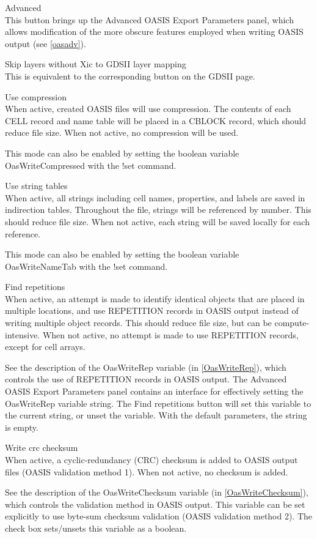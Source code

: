 \begin{description}
\item{\cb Advanced}\\
This button brings up the {\cb Advanced OASIS Export Parameters}
panel, which allows modification of the more obscure features employed
when writing OASIS output (see \ref{oasadv}).

\item{\cb Skip layers without Xic to GDSII layer mapping}\\
This is equivalent to the corresponding button on the GDSII page.

\item{\cb Use compression}\\
When active, created OASIS files will use compression.  The contents
of each CELL record and name table will be placed in a CBLOCK record,
which should reduce file size.  When not active, no compression will
be used.

This mode can also be enabled by setting the boolean variable {\et
OasWriteCompressed} with the {\cb !set} command.

\item{\cb Use string tables}\\
When active, all strings including cell names, properties, and labels
are saved in indirection tables.  Throughout the file, strings will be
referenced by number.  This should reduce file size.  When not active,
each string will be saved locally for each reference.

This mode can also be enabled by setting the boolean variable {\et
OasWriteNameTab} with the {\cb !set} command.

\item{\cb Find repetitions}\\
When active, an attempt is made to identify identical objects that are
placed in multiple locations, and use REPETITION records in OASIS
output instead of writing multiple object records.  This should reduce
file size, but can be compute-intensive.  When not active, no attempt
is made to use REPETITION records, except for cell arrays.

See the description of the {\et OasWriteRep} variable (in
\ref{OasWriteRep}), which controls the use of REPETITION records in
OASIS output.  The {\cb Advanced OASIS Export Parameters} panel
contains an interface for effectively setting the {\et OasWriteRep}
variable string.  The {\cb Find repetitions} button will set this
variable to the current string, or unset the variable.  With the
default parameters, the string is empty.

\item{\cb Write crc checksum}\\
When active, a cyclic-redundancy (CRC) checksum is added to OASIS
output files (OASIS validation method 1).  When not active, no
checksum is added.

See the description of the {\et OasWriteChecksum} variable (in
\ref{OasWriteChecksum}), which controls the validation method in OASIS
output.  This variable can be set explicitly to use byte-sum checksum
validation (OASIS validation method 2).  The check box sets/unsets
this variable as a boolean.
\end{description}

